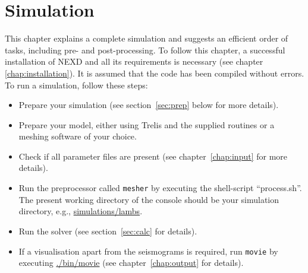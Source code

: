 \chapter{Simulation}
\label{chap:simulation}
	This chapter explains a complete simulation and suggests an efficient order of tasks, including pre- and post-processing. To follow this chapter, a successful installation of NEXD and all its requirements is necessary (see chapter \ref{chap:installation}). It is assumed that the code has been compiled without errors. To run a simulation, follow these steps:
	\begin{itemize}
		\item Prepare your simulation (see section~\ref{sec:prep} below for more details).
    	\item Prepare your model, either using Trelis and the supplied routines or a meshing software of your choice.
    	\item Check if all parameter files are present (see chapter~\ref{chap:input} for more details).
    	\item Run the preprocessor called \texttt{mesher} by executing the shell-script ``process.sh''. The present working directory of the console should be your simulation directory, e.g., \url{simulations/lambs}.
   		 \item Run the solver (see section~\ref{sec:calc} for details).
    	 \item If a visualisation apart from the seismograms is required, run \texttt{movie} by executing \url{./bin/movie} (see chapter~\ref{chap:output} for details).
	\end{itemize}	 
